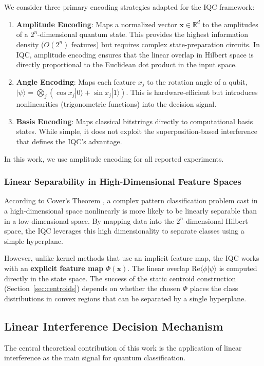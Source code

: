\documentclass[conference]{IEEEtran}
\begin{document}
We consider three primary encoding strategies adapted for the IQC framework:
\begin{enumerate}
    \item \textbf{Amplitude Encoding}: Maps a normalized vector $\mathbf{x} \in \mathbb{R}^d$ to the amplitudes of a $2^n$-dimensional quantum state. This provides the highest information density ($O(2^n)$ features) but requires complex state-preparation circuits. In IQC, amplitude encoding ensures that the linear overlap in Hilbert space is directly proportional to the Euclidean dot product in the input space.
    \item \textbf{Angle Encoding}: Maps each feature $x_j$ to the rotation angle of a qubit, $|\psi\rangle = \bigotimes_j ( \cos x_j |0\rangle + \sin x_j |1\rangle)$. This is hardware-efficient but introduces nonlinearities (trigonometric functions) into the decision signal.
    \item \textbf{Basis Encoding}: Maps classical bitstrings directly to computational basis states. While simple, it does not exploit the superposition-based interference that defines the IQC's advantage.
\end{enumerate}
In this work, we use amplitude encoding for all reported experiments.

\subsubsection{Linear Separability in High-Dimensional Feature Spaces}
According to Cover's Theorem \cite{cover1965geometrical}, a complex pattern classification problem cast in a high-dimensional space nonlinearly is more likely to be linearly separable than in a low-dimensional space. By mapping data into the $2^n$-dimensional Hilbert space, the IQC leverages this high dimensionality to separate classes using a simple hyperplane.

However, unlike kernel methods that use an implicit feature map, the IQC works with an \textbf{explicit feature map} $\Phi(\mathbf{x})$. The linear overlap $\mathrm{Re}\langle \phi | \psi \rangle$ is computed directly in the state space. The success of the static centroid construction (Section~\ref{sec:centroids}) depends on whether the chosen $\Phi$ places the class distributions in convex regions that can be separated by a single hyperplane.

\subsection{Linear Interference Decision Mechanism}
The central theoretical contribution of this work is the application of linear interference as the main signal for quantum classification.
\end{document}

